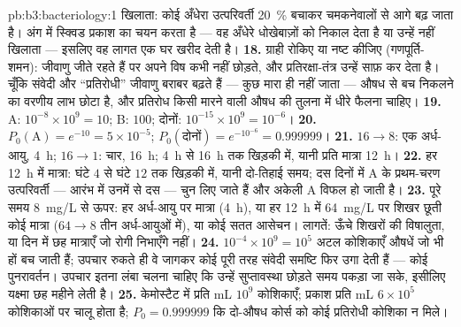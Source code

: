 \begin{solution}{pb:b3:bacteriology:1}
खिलाता: कोई अँधेरा उत्परिवर्ती \qty{20}{\%} बचाकर चमकनेवालों से आगे
बढ़ जाता है। अंग में स्क्विड प्रकाश का चयन करता है --- वह अँधेरे
धोखेबाज़ों को निकाल देता है या उन्हें नहीं खिलाता --- इसलिए वह लागत एक
घर खरीद देती है।
\textbf{18.} ग्राही रोकिए या  नष्ट कीजिए (गणपूर्ति-शमन):
जीवाणु जीते रहते हैं पर अपने विष कभी नहीं छोड़ते, और प्रतिरक्षा-तंत्र
उन्हें साफ़ कर देता है। चूँकि संवेदी और ``प्रतिरोधी'' जीवाणु बराबर बढ़ते
हैं --- कुछ मारा ही नहीं जाता --- औषध से बच निकलने का वरणीय लाभ छोटा
है, और प्रतिरोध किसी मारने वाली औषध की तुलना में धीरे फैलना चाहिए।
\textbf{19.} A: $10^{-8}\times 10^{9} = 10$; B: $100$; दोनों: $10^{-15}\times
10^{9} = 10^{-6}$।
\textbf{20.} $P_{0}(\text{A}) = e^{-10} = 5\times 10^{-5}$;
$P_{0}(\text{दोनों}) = e^{-10^{-6}} = 0.999999$।
\textbf{21.} $16 \to 8$: एक अर्ध-आयु, \qty{4}{h}; $16 \to 1$: चार,
\qty{16}{h}; \qty{4}{h} से \qty{16}{h} तक खिड़की में, यानी प्रति मात्रा
\qty{12}{h}।
\textbf{22.} हर \qty{12}{h} में मात्रा: घंटे $4$ से घंटे
$12$ तक खिड़की में, यानी दो-तिहाई समय; दस दिनों में A के प्रथम-चरण
उत्परिवर्ती --- आरंभ में उनमें से दस --- चुन लिए जाते हैं और अकेली A
विफल हो जाती है।
\textbf{23.} पूरे समय \qty{8}{mg/L} से ऊपर: हर अर्ध-आयु पर मात्रा
(\qty{4}{h}), या हर \qty{12}{h} में \qty{64}{mg/L} पर शिखर छूती कोई मात्रा
($64 \to 8$ तीन अर्ध-आयुओं में), या कोई सतत आसेचन। लागतें: ऊँचे शिखरों
की विषालुता, या दिन में छह मात्राएँ जो रोगी निभाएँगे नहीं।
\textbf{24.} $10^{-4}\times 10^{9} = 10^{5}$ अटल कोशिकाएँ औषधें जो भी
हों बच जाती हैं; उपचार रुकते ही वे जागकर कोई पूरी तरह संवेदी समष्टि
फिर उगा देती हैं --- कोई पुनरावर्तन। उपचार इतना लंबा चलना चाहिए कि
उन्हें सुप्तावस्था छोड़ते समय पकड़ा जा सके, इसीलिए यक्ष्मा छह महीने लेती है।
\textbf{25.} केमोस्टैट में प्रति mL $10^{9}$ कोशिकाएँ; प्रकाश प्रति mL
$6\times 10^{5}$ कोशिकाओं पर चालू होता है; $P_{0} = 0.999999$ कि
दो-औषध कोर्स को कोई प्रतिरोधी कोशिका न मिले।
\end{solution}
